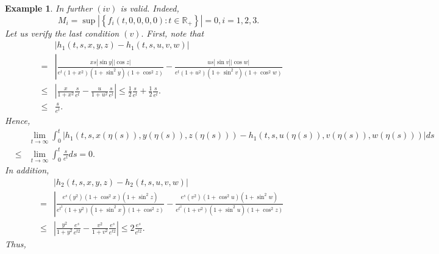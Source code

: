 \documentclass{amsart}
\theoremstyle{plain}
\newtheorem{example}{Example}
\numberwithin{equation}{section}
\begin{document}
\begin{example}
In further $\left( iv\right) $ is valid. Indeed,\begin{equation*}
M_{i}=\sup \left\vert \left\{ f_{i}\left( t,0,0,0,0\right) :t\in \mathbb{R}_{+}\right\} \right\vert =0,i=1,2,3.
\end{equation*}Let us verify the last condition $\left( v\right) .$ First, note that\begin{eqnarray*}
&&\left\vert h_{1}\left( t,s,x,y,z\right) -h_{1}\left( t,s,u,v,w\right)
\right\vert \\
&=&\left\vert \frac{xs\left\vert \sin y\right\vert \left\vert \cos
z\right\vert }{e^{t}\left( 1+x^{2}\right) \left( 1+\sin ^{2}y\right) \left(
1+\cos ^{2}z\right) }-\frac{us\left\vert \sin v\right\vert \left\vert \cos
w\right\vert }{e^{t}\left( 1+u^{2}\right) \left( 1+\sin ^{2}v\right) \left(
1+\cos ^{2}w\right) }\right. \\
&\leqslant &\left\vert \frac{x}{1+x^{2}}\frac{s}{e^{t}}-\frac{u}{1+u^{2}}\frac{s}{e^{t}}\right\vert \leqslant \frac{1}{2}\frac{s}{e^{t}}+\frac{1}{2}\frac{s}{e^{t}}. \\
&\leqslant &\frac{s}{e^{t}}.
\end{eqnarray*}Hence,\begin{eqnarray*}
&&\lim_{t\rightarrow \infty }\int_{0}^{t}\left\vert h_{1}\left( t,s,x\left(
\eta \left( s\right) \right) ,y\left( \eta \left( s\right) \right) ,z\left(
\eta \left( s\right) \right) \right) -h_{1}\left( t,s,u\left( \eta \left(
s\right) \right) ,v\left( \eta \left( s\right) \right) ,w\left( \eta \left(
s\right) \right) \right) \right\vert ds \\
&\leqslant &\lim_{t\rightarrow \infty }\int_{0}^{t}\frac{s}{e^{t}}ds=0.
\end{eqnarray*}In addition,\begin{eqnarray*}
&&\left\vert h_{2}\left( t,s,x,y,z\right) -h_{2}\left( t,s,u,v,w\right)
\right\vert \\
&=&\left\vert \frac{e^{s}\left( y^{2}\right) \left( 1+\cos ^{2}x\right)
\left( 1+\sin ^{2}z\right) }{e^{t^{2}}\left( 1+y^{2}\right) \left( 1+\sin
^{2}x\right) \left( 1+\cos ^{2}z\right) }-\frac{e^{s}\left( v^{2}\right)
\left( 1+\cos ^{2}u\right) \left( 1+\sin ^{2}w\right) }{e^{t^{2}}\left(
1+v^{2}\right) \left( 1+\sin ^{2}u\right) \left( 1+\cos ^{2}z\right) }\right.
\\
&\leqslant &\left\vert \frac{y^{2}}{1+y^{2}}\frac{e^{s}}{e^{t2}}-\frac{v^{2}}{1+v^{2}}\frac{e^{s}}{e^{t2}}\right\vert \leqslant 2\frac{e^{s}}{e^{t2}}.
\end{eqnarray*}Thus,\begin{eqnarray*}

\end{eqnarray*}
\end{example}
\end{document}
